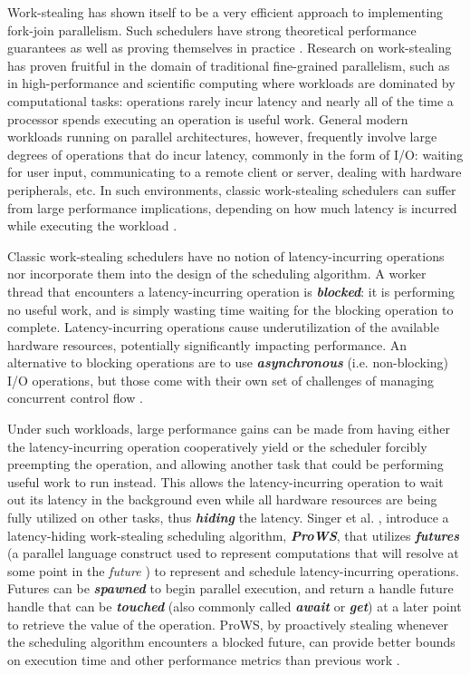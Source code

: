 \documentclass[bsc,frontabs,singlespacing,parskip,deptreport,normalheadings]{infthesis}
\begin{document}
Work-stealing has shown itself to be a very efficient approach to implementing
fork-join parallelism. Such schedulers have strong theoretical performance
guarantees \cite{blumofe_scheduling_1999} as well as proving themselves in
practice \cite{arora_thread_1998}. Research on work-stealing has proven fruitful
in the domain of traditional fine-grained parallelism, such as in
high-performance and scientific computing where workloads are dominated by
computational tasks: operations rarely incur latency and nearly all of the time
a processor spends executing an operation is useful work. General modern
workloads running on parallel architectures, however, frequently involve large
degrees of operations that do incur latency, commonly in the form of I/O:
waiting for user input, communicating to a remote client or server, dealing with
hardware peripherals, etc. In such environments, classic work-stealing
schedulers can suffer from large performance implications, depending on how much
latency is incurred while executing the workload
\cite{muller_latency-hiding_2016, singer_scheduling_2019, zakian_concurrent_2016}.

Classic work-stealing schedulers have no notion of latency-incurring operations
nor incorporate them into the design of the scheduling algorithm. A worker
thread that encounters a latency-incurring operation is
\textbf{\textit{blocked}}: it is performing no useful work, and is simply
wasting time waiting for the blocking operation to complete. Latency-incurring
operations cause underutilization of the available hardware resources,
potentially significantly impacting performance. An alternative to blocking
operations are to use \textbf{\textit{asynchronous}} (i.e. non-blocking) I/O
operations, but those come with their own set of challenges of managing
concurrent control flow \cite{niebler_structured_2020, smith_notes_nodate}.

Under such workloads, large performance gains can be made from having either the
latency-incurring operation cooperatively yield or the scheduler forcibly
preempting the operation, and allowing another task that could be performing
useful work to run instead. This allows the latency-incurring operation to wait
out its latency in the background even while all hardware resources are being
fully utilized on other tasks, thus \textbf{\textit{hiding}} the latency. Singer
et al. \cite{singer_proactive_2019}, introduce a latency-hiding work-stealing
scheduling algorithm, \textit{\textbf{ProWS}}, that utilizes
\textbf{\textit{futures}} (a parallel language construct used to represent
computations that will resolve at some point in the \textit{future}
\cite{halstead_implementation_1984, halstead_multilisp_1985}) to represent and
schedule latency-incurring operations. Futures can be \textbf{\textit{spawned}}
to begin parallel execution, and return a handle future handle that can be
\textbf{\textit{touched}} (also commonly called \textbf{\textit{await}} or
\textbf{\textit{get}}) at a later point to retrieve the value of the operation.
ProWS, by proactively stealing whenever the scheduling algorithm encounters a
blocked future, can provide better bounds on execution time and other
performance metrics than previous work \cite{muller_latency-hiding_2016,
spoonhower_beyond_2009}.
\end{document}
